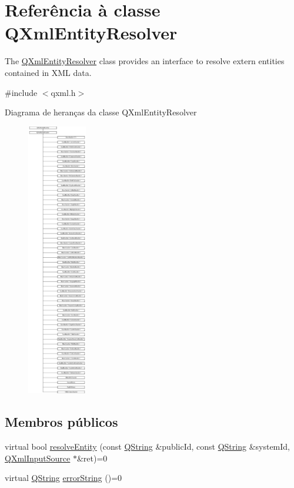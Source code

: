 \hypertarget{class_q_xml_entity_resolver}{\section{Referência à classe Q\-Xml\-Entity\-Resolver}
\label{class_q_xml_entity_resolver}
}


The \hyperlink{class_q_xml_entity_resolver}{Q\-Xml\-Entity\-Resolver} class provides an interface to resolve extern entities contained in X\-M\-L data.  




{\ttfamily \#include $<$qxml.\-h$>$}

Diagrama de heranças da classe Q\-Xml\-Entity\-Resolver\begin{figure}[H]
\begin{center}
\leavevmode
\includegraphics[height=12.000000cm]{class_q_xml_entity_resolver}
\end{center}
\end{figure}
\subsection*{Membros públicos}
\begin{DoxyCompactItemize}
\item 
virtual bool \hyperlink{class_q_xml_entity_resolver_acfb103872f68c3167db3aa42f51bee81}{resolve\-Entity} (const \hyperlink{class_q_string}{Q\-String} \&public\-Id, const \hyperlink{class_q_string}{Q\-String} \&system\-Id, \hyperlink{class_q_xml_input_source}{Q\-Xml\-Input\-Source} $\ast$\&ret)=0
\item 
virtual \hyperlink{class_q_string}{Q\-String} \hyperlink{class_q_xml_entity_resolver_ac86bbbabef3a52aec7615cbbc0adb3f4}{error\-String} ()=0
\end{DoxyCompactItemize}


